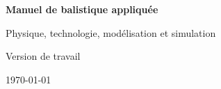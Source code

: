 \begin{titlepage}
\centering

\vspace*{3cm}

{\Huge\bfseries Manuel de balistique appliquée\par}

\vspace{1cm}

{\Large Physique, technologie, modélisation et simulation\par}

\vfill

Version de travail

\vspace{2cm}

\today

\end{titlepage}

